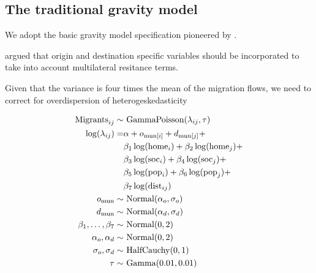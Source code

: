 \documentclass[fleqn,10pt]{SelfArx} %
\begin{document}
        \subsection{The traditional gravity model}

        We adopt the basic gravity model specification pioneered by
        \citet{tinbergen1962shaping}.

        \citet{anderson2003gravity} argued that origin and destination
        specific variables should be incorporated to take into account
        multilateral resitance terms.

        Given that the variance is four times the mean of the
        migration flows, we need to correct for overdispersion of
        heterogeskedasticity \citep[][states that heteroskedasticity
        (rather than the presence of too many zeros) is responsible
        for the main differences.]{silva2006log}

        \begin{subequations}
          \begin{align} \text{Migrants}_{ij} \sim & \text{
              GammaPoisson}(\lambda_{ij}, \tau)\\ \log(\lambda_{ij}) =
            & \alpha + o_{\text{mun}[i]} + d_{\text{mun}[j]} + \notag
            \\ & \beta_1 \log(\text{home}_i) +
            \beta_2\log(\text{home}_j) + \notag \\ & \beta_3
            \log(\text{soc}_i) + \beta_4 \log(\text{soc}_j) + \notag\\
            & \beta_5 \log(\text{pop}_i) + \beta_6 \log(\text{pop}_j)
            + \notag \\ & \beta_7 \log(\text{dist}_{ij}) \\
            o_{\text{mun}} \sim& \text{ Normal}(\alpha_o, \sigma_o)\\
            d_{\text{mun}} \sim& \text{ Normal}(\alpha_d, \sigma_d)\\
            \beta_1,\ldots, \beta_7 \sim& \text{
                                          Normal}(0,2)\\ \alpha_o, \alpha_d \sim& \text{ Normal}(0,2)\\
            \sigma_o, \sigma_d \sim& \text{ HalfCauchy}(0,1) \\ \tau
            \sim& \text{ Gamma}(0.01, 0.01)
          \end{align}
          \label{model}
        \end{subequations}
\end{document}
